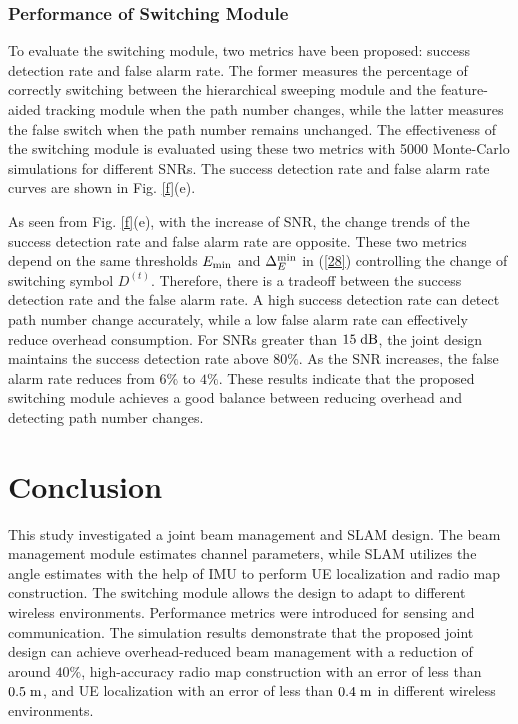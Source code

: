 \documentclass[journal,12pt,onecolumn,draftclsnofoot,]{IEEEtran}
\begin{document}
{\color{black}
\subsubsection{Performance of Switching Module}
To evaluate the switching module, two metrics have been proposed: success detection rate and false alarm rate. 
The former measures the percentage of correctly switching between the hierarchical sweeping module and the feature-aided tracking module when the path number changes, while the latter measures the false switch when the path number remains unchanged. 
The effectiveness of the switching module is evaluated using these two metrics with 5000 Monte-Carlo simulations for different SNRs. 
The success detection rate and false alarm rate curves are shown in Fig. \ref{f}(e).

As seen from Fig. \ref{f}(e), with the increase of SNR, the change trends of the success detection rate and false alarm rate are opposite. 
These two metrics depend on the same thresholds $E_{\rm{min}}$ and $\Delta _E^{\rm min} $ in (\ref{28}) controlling the change of switching symbol ${D^{(t)}}$. 
Therefore, there is a tradeoff between the success detection rate and the false alarm rate. 
A high success detection rate can detect path number change accurately, while a low false alarm rate can effectively reduce overhead consumption. 
For SNRs greater than $15\;{\rm{dB}}$, the joint design maintains the success detection rate above $80\%$. As the SNR increases, the false alarm rate reduces from $6\%$ to $4\%$.
These results indicate that the proposed switching module achieves a good balance between reducing overhead and detecting path number changes.


}
\vspace{-3.5mm}
\section{Conclusion}
\vspace{-1.5mm}
This study investigated a joint beam management and SLAM design. 
The beam management module estimates channel parameters, while SLAM utilizes the angle estimates with the help of IMU to perform UE localization and radio map construction. 
The switching module allows the design to adapt to different wireless environments. Performance metrics were introduced for sensing and communication. 
The simulation results demonstrate that the proposed joint design can achieve overhead-reduced beam management with a reduction of around $40\%$, high-accuracy radio map construction with an error of less than $0.5 \;{\rm m}$, and UE localization with an error of less than $0.4 \;{\rm m}$ in different wireless environments.
\end{document}
